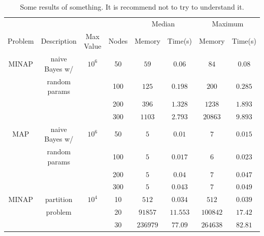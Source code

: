 \documentclass{article}
\begin{document}
{  \begin{table}[ht]
      \caption{Some results of something. It is recommend not to try to understand it.\label{table:somethinginside}}
      \begin{center}
          \begin{tabular}{cccc|cc|cc}
                      &                &           &       & \multicolumn{2}{c|}{Median} & \multicolumn{2}{c}{Maximum}                       \\
              Problem & Description    & Max Value & Nodes & Memory                      & Time(s)                     & Memory    & Time(s) \\
              \hline
              MINAP   & naive Bayes w/ & $10^{6}$  & 50    & $59$                        & $0.06$                      & $84$      & $0.08$  \\
                      & random params  &           & 100   & $125$                       & $0.198$                     & $200$     & $0.285$ \\
                      &                &           & 200   & $396$                       & $1.328$                     & $1238$    & $1.893$ \\
                      &                &           & 300   & $1103$                      & $2.793$                     & $20863$   & $9.893$ \\
              MAP     & naive Bayes w/ & $10^{6}$  & 50    & $5$                         & $0.01$                      & $7$       & $0.015$ \\
                      & random params  &           & 100   & $5$                         & $0.017$                     & $6$       & $0.023$ \\
                      &                &           & 200   & $5$                         & $0.04$                      & $7$       & $0.047$ \\
                      &                &           & 300   & $5$                         & $0.043$                     & $7$       & $0.049$ \\
              MINAP   & partition      & $10^{4}$  & 10    & $512$                       & $0.034$                     & $512$     & $0.039$ \\
                      & problem        &           & 20    & $91857$                     & $11.553$                    & $100842$  & $17.42$ \\
                      &                &           & 30    & $236979$                    & $77.09$                     & $264638$  & $82.81$ \\

\end{tabular}
\end{center}
\end{table}}
\end{document}
